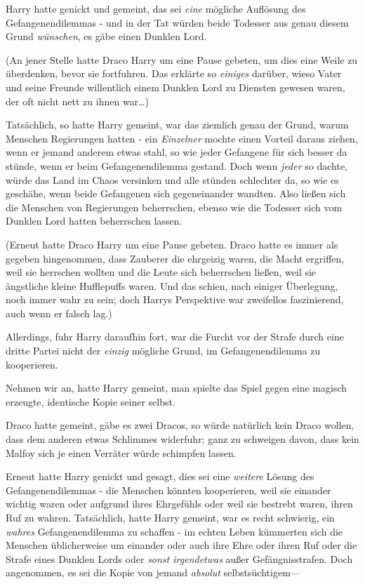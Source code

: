 {Harry hatte genickt und gemeint, das sei \emph{eine} mögliche Auflösung des Gefangenendilemmas - und in der Tat würden beide Todesser aus genau diesem Grund \emph{wünschen}, es gäbe einen Dunklen Lord.

(An jener Stelle hatte Draco Harry um eine Pause gebeten, um dies eine Weile zu überdenken, bevor sie fortfuhren. Das erklärte so \emph{einiges} darüber, wieso Vater und seine Freunde willentlich einem Dunklen Lord zu Diensten gewesen waren, der oft nicht nett zu ihnen war…)

Tatsächlich, so hatte Harry gemeint, war das ziemlich genau der Grund, warum Menschen Regierungen hatten - ein \emph{Einzelner} mochte einen Vorteil daraus ziehen, wenn er jemand anderem etwas stahl, so wie jeder Gefangene für sich besser da stünde, wenn er beim Gefangenendilemma gestand. Doch wenn \emph{jeder} so dachte, würde das Land im Chaos versinken und alle stünden schlechter da, so wie es geschähe, wenn beide Gefangenen sich gegeneinander wandten. Also ließen sich die Menschen von Regierungen beherrschen, ebenso wie die Todesser sich vom Dunklen Lord hatten beherrschen lassen.

(Erneut hatte Draco Harry um eine Pause gebeten. Draco hatte es immer als gegeben hingenommen, dass Zauberer die ehrgeizig waren, die Macht ergriffen, weil sie herrschen wollten und die Leute sich beherrschen ließen, weil sie ängstliche kleine Hufflepuffs waren. Und das schien, nach einiger Überlegung, noch immer wahr zu sein; doch Harrys Perspektive war zweifellos faszinierend, auch wenn er falsch lag.)

Allerdings, fuhr Harry daraufhin fort, war die Furcht vor der Strafe durch eine dritte Partei nicht der \emph{einzig} mögliche Grund, im Gefangenendilemma zu kooperieren.

Nehmen wir an, hatte Harry gemeint, man spielte das Spiel gegen eine magisch erzeugte, identische Kopie seiner selbst.

Draco hatte gemeint, gäbe es zwei Dracos, so würde natürlich kein Draco wollen, dass dem anderen etwas Schlimmes widerfuhr; ganz zu schweigen davon, dass kein Malfoy sich je einen Verräter würde schimpfen lassen.

Erneut hatte Harry genickt und gesagt, dies sei eine \emph{weitere} Lösung des Gefangenendilemmas - die Menschen könnten kooperieren, weil sie einander wichtig waren oder aufgrund ihres Ehrgefühls oder weil sie bestrebt waren, ihren Ruf zu wahren. Tatsächlich, hatte Harry gemeint, war es recht schwierig, ein \emph{wahres} Gefangenendilemma zu schaffen - im echten Leben kümmerten sich die Menschen üblicherweise um einander oder auch ihre Ehre oder ihren Ruf oder die Strafe eines Dunklen Lords oder \emph{sonst irgendetwas} außer Gefängnisstrafen. Doch angenommen, es sei die Kopie von jemand \emph{absolut} selbstsüchtigem—

}
